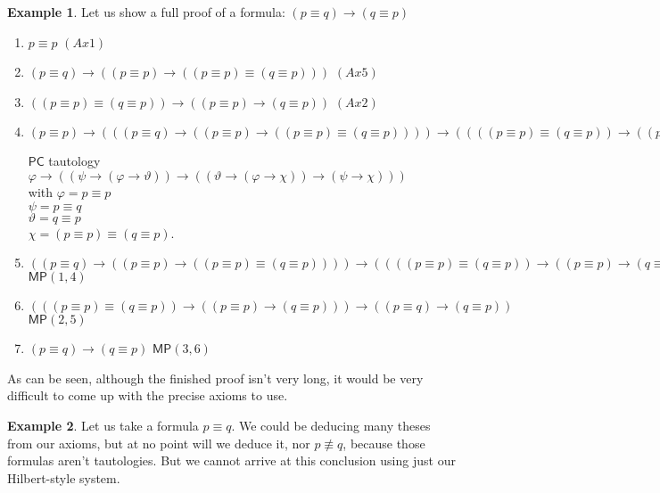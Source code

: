 \documentclass{article}
\theoremstyle{definition}
\theoremstyle{definition}
\newtheorem{example}{Example}[section]
\theoremstyle{definition}
\newcommand*{\id}{\equiv}
\newcommand*{\ra}{\rightarrow}
\newcommand{\PC}{$\mathsf{PC}$\xspace}
\newcommand{\MP}{\mathsf{MP}}
\begin{document}
\begin{example}
    \label{ex_pqqp}
    Let us show a full proof of a formula: $(p \id q) \ra (q \id p)$

    \begin{enumerate}
        \item $p \id p$ \hfill $(Ax1)$
        \item $(p \id q) \ra ((p \id p) \ra ((p \id p) \id (q \id p)))$ \hfill $(Ax5)$
        \item $((p \id p) \id (q \id p)) \ra ((p \id p) \ra (q \id p))$ \hfill $(Ax2)$
        \item $(p \id p) \ra (((p \id q) \ra ((p \id p) \ra ((p \id p) \id (q \id p)))) \ra ((((p \id p) \id (q \id p)) \ra ((p \id p) \ra (q \id p))) \ra ((p \id q) \ra (q \id p))))$
              \begin{flushright}
                  \PC tautology $\varphi \ra ((\psi \ra (\varphi \ra \vartheta)) \ra ((\vartheta \ra (\varphi \ra \chi)) \ra (\psi \ra \chi)))$
                  \\
                  with $\varphi = p \id p$\\$\psi = p \id q$\\$\vartheta = q \id p$\\$\chi = (p \id p) \id (q \id p)$.
              \end{flushright}
        \item $((p \id q) \ra ((p \id p) \ra ((p \id p) \id (q \id p)))) \ra ((((p \id p) \id (q \id p)) \ra ((p \id p) \ra (q \id p))) \ra ((p \id q) \ra (q \id p)))$ \hfill $\MP(1, 4)$
        \item $(((p \id p) \id (q \id p)) \ra ((p \id p) \ra (q \id p))) \ra ((p \id q) \ra (q \id p))$ \hfill $\MP(2, 5)$
        \item $(p \id q) \ra (q \id p)$ \hfill $\MP(3, 6)$
    \end{enumerate}

\end{example}
%
As can be seen, although the finished proof isn't very long, it would be very
difficult to come up with the precise axioms to use.

\begin{example}
    Let us take a formula $p \id q$. We could be deducing many theses from our axioms, but at no point will we deduce it, nor $p \not \id q$, because those formulas aren't tautologies. But we cannot arrive at this conclusion using just our Hilbert-style system.
\end{example}
\end{document}
